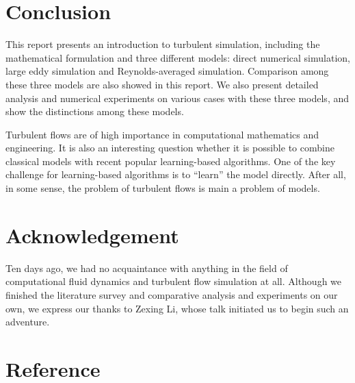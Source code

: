 \documentclass[english, nochinese]{pkupaper}
\begin{document}
\section{Conclusion} \label{Sec:Con}

This report presents an introduction to turbulent simulation, including the mathematical formulation and three different models: direct numerical simulation, large eddy simulation and Reynolds-averaged simulation. Comparison among these three models are also showed in this report. We also present detailed analysis and numerical experiments on various cases with these three models, and show the distinctions among these models.

Turbulent flows are of high importance in computational mathematics and engineering. It is also an interesting question whether it is possible to combine classical models with recent popular learning-based algorithms. One of the key challenge for learning-based algorithms is to ``learn'' the model directly. After all, in some sense, the problem of turbulent flows is main a problem of models.

\section{Acknowledgement} \label{Sec:Ack}

Ten days ago, we had no acquaintance with anything in the field of computational fluid dynamics and turbulent flow simulation at all. Although we finished the literature survey and comparative analysis and experiments on our own, we express our thanks to Zexing Li, whose talk initiated us to begin such an adventure.

\section{Reference}

\printbibliography
\end{document}

